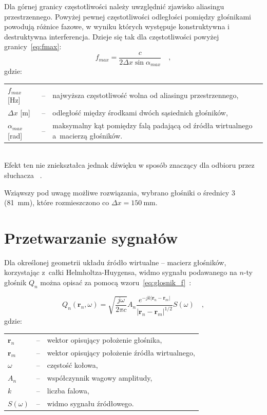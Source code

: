 \documentclass[12pt]{oska}
\let\Oldsection\section
\renewcommand{\section}{\FloatBarrier\Oldsection}
\begin{document}
Dla górnej granicy częstotliwości należy
uwzględnić zjawisko aliasingu przestrzennego. Powyżej pewnej częstotliwości
odległości pomiędzy głośnikami powodują różnice fazowe, w wyniku których występuje
konstruktywna i destruktywna interferencja. Dzieje się tak dla częstotliwości
powyżej granicy~\eqref{eq:fmax}:
\begin{equation}
  f_{max}=\frac{c}{2\Delta x \sin{\alpha_{max}}} \quad, \label{eq:fmax}
\end{equation}
gdzie:\\
	\indent \begin{tabular}{l c p{}}
			$f_{max}$ [\si{\hertz}] & -- & najwyższa częstotliwość wolna od aliasingu przestrzennego, \\
			$\Delta x$ [\si{\metre}] & -- & odległość między środkami dwóch sąsiednich głośników, \\
				$\alpha_{max}$ [\si{\radian}] & -- & maksymalny kąt pomiędzy falą padającą od źródła wirtualnego a~macierzą głośników.\\
			\end{tabular}\\

\noindent Efekt ten nie zniekształca jednak dźwięku w sposób znaczący dla odbioru przez słuchacza
~\cite{hq_rendering}.

Wziąwszy pod uwagę możliwe rozwiązania, wybrano głośniki o średnicy \SI{3}{\inch}
(\SI{81}{\milli\meter}), które rozmieszczono co
$\Delta x=\SI{150}{\milli\meter}$.

\section{Przetwarzanie sygnałów}\label{s:algorithm}

Dla określonej geometrii układu źródło wirtualne -- macierz głośników, korzystając z~całki Helmholtza-Huygensa,
widmo sygnału podawanego na $n$-ty głośnik $Q_n$ można opisać za pomocą
wzoru~\eqref{eq:glosnik_f}~\cite{delay}:

\begin{equation}
  Q_n(\bm{r}_n,\omega) = \sqrt{\frac{j\omega}{2\pi c}} A_n \frac {e^{-jk|\bm{r}_n-\bm{r}_m|}}{|\bm{r}_n-\bm{r}_m|^{1/2}} S(\omega) \quad,
  \label{eq:glosnik_f}
\end{equation}
gdzie:\\
	\indent \begin{tabular}{l c p{}}
				$\bm{r}_n$ & -- & wektor opisujący położenie głośnika, \\
				$\bm{r}_m$ & -- & wektor opisujący położenie źródła wirtualnego,\\
				$\omega$ & -- & częstość kołowa, \\
				$A_n$ & -- & współczynnik wagowy amplitudy,\\
				$k$ & -- & liczba falowa,\\
				$S(\omega)$ & -- & widmo sygnału źródłowego.
			\end{tabular}\\
\end{document}
